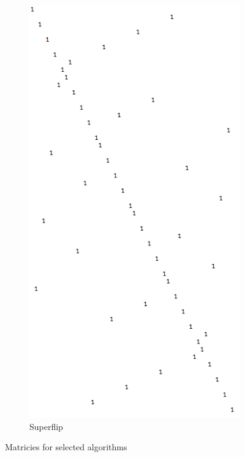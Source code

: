 \documentclass[11pt, oneside]{article}
\theoremstyle{plain}
\begin{document}
\begin{figure}[h!]
\begin{subfigure}[h]{0.4 \textwidth}
      \includegraphics[scale=0.3]{superflip}
      \caption{Superflip}
  \end{subfigure}
  \caption{Matricies for selected algorithms}
\end{figure}
\end{document}

